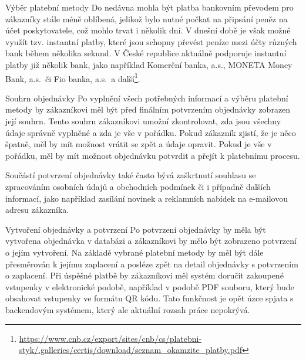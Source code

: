 \begin{subsection}{Výběr platební metody}
    Do nedávna mohla být platba bankovním převodem pro zákazníky stále méně oblíbená, jelikož bylo nutné počkat na připsání peněz na účet poskytovatele, což mohlo trvat i několik dní.
    V dnešní době je však možné využít tzv.
    instantní platby, které jsou schopny převést peníze mezi účty různých bank během několika sekund.
    V České republice aktuálně podporuje instantní platby již několik bank, jako například Komerční banka, a.s., MONETA Money Bank, a.s.\ či Fio banka, a.s.\ a další\footnote{\url{https://www.cnb.cz/export/sites/cnb/cs/platebni-styk/.galleries/certis/download/seznam_okamzite_platby.pdf}}.
\end{subsection}

\begin{subsection}{Souhrn objednávky}
    \label{subsec:identifikace-dokonceni-objednavky-souhrn-objednavky}
    Po vyplnění všech potřebných informací a výběru platební metody by zákazníkovi měl být před finálním potvrzením objednávky zobrazen její souhrn.
    Tento souhrn zákazníkovi umožní zkontrolovat, zda jsou všechny údaje správně vyplněné a zda je vše v pořádku.
    Pokud zákazník zjistí, že je něco špatně, měl by mít možnost vrátit se zpět a údaje opravit.
    Pokud je vše v pořádku, měl by mít možnost objednávku potvrdit a přejít k platebnímu procesu.

    Součástí potvrzení objednávky také často bývá zaškrtnutí souhlasu se zpracováním osobních údajů a obchodních podmínek či i případně dalších informací, jako například zasílání novinek a reklamních nabídek na e-mailovou adresu zákazníka.
\end{subsection}

\begin{subsection}{Vytvoření objednávky a potvrzení}
    \label{subsec:identifikace-dokonceni-objednavky-vytvoreni-objednavky-a-potvrzeni}
    Po potvrzení objednávky by měla být vytvořena objednávka v databázi a zákazníkovi by mělo být zobrazeno potvrzení o jejím vytvoření.
    Na základě vybrané platební metody by měl být dále přesměrován k jejímu zaplacení a posléze zpět na detail objednávky s potvrzením o zaplacení.
    Při úspěšné platbě by zákazníkovi měl systém doručit zakoupené vstupenky v elektronické podobě, například v podobě PDF souboru, který bude obsahovat vstupenky ve formátu QR kódu.
    Tato funkčnost je opět úzce spjata s backendovým systémem, který ale aktuální rozsah práce nepokrývá.
\end{subsection}
